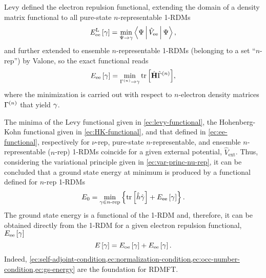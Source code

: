 Levy defined the electron repulsion functional, extending the domain of a density matrix 
functional to all pure-state $n$-representable 1-RDMs
\begin{equation} \label{ec:levy-functional}
    \func{E_{\text{ee}}^{\text{L}}}{\fordm} = 
    \min_{\Psi \to \fordm} \Braket{\Psi | \hat{V}_{\text{ee}} | \Psi}
    ,
\end{equation}
and further extended to ensemble $n$-representable 1-RDMs (belonging to a set
``$n$-rep'') by Valone, so the
exact functional reads 
\begin{equation} \label{ec:ee-functional}
    \func{E_{\text{ee}}}{\fordm} =
    \min_{\sordm^{\left( n \right)}\to \fordm} \mytrace{\hat{ \mat{H}} \hat{\sordm}^{\left( n \right)}}
    ,
\end{equation}
where the minimization is carried out with respect to $n$-electron density
matrices $\Gamma^{\left( n \right)}$ that yield $\gamma$.

The minima of the Levy functional given in \cref{ec:levy-functional}, the 
Hohenberg-Kohn functional given in \cref{ec:HK-functional}, and that defined in
\cref{ec:ee-functional}, respectively for $\nu$-rep, pure-state $n$-representable,
and ensemble $n$-representable ($n$-rep) 1-RDMs coincide
for a given external potential, $\hat{V}_{\text{ext}}$.
Thus, considering the variational principle given in \cref{ec:var-princ-nu-rep}, 
it can be concluded that a ground state energy at minimum is produced by a 
functional defined for $n$-rep 1-RDMs
\begin{equation} \label{ec:gs-energy}
    E_0 = \min_{\fordm \in \text{$n$-rep}}
    \left\{ \mytrace{\hat{h} \hat{\fordm}} + \func{E_{\text{ee}}}{\fordm} \right\}
    .
\end{equation}
The ground state energy is a functional of the 1-RDM and, therefore, it can be
obtained directly from the 1-RDM for a given electron repulsion functional,
$E_{\text{ee}}\left[ \gamma \right]$
\begin{equation}
    E \left[ \gamma \right] = 
    E_{\text{oe}} \left[ \gamma \right] +
    E_{\text{ee}} \left[ \gamma \right]
    .
\end{equation}
Indeed, \cref{ec:self-adjoint-condition,ec:normalization-condition,ec:occ-number-condition,ec:gs-energy}
are the foundation for RDMFT.

